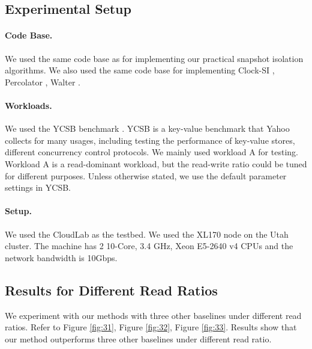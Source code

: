 


\subsection{Experimental Setup}

\paragraph{Code Base.} We used the same code base as \cite{lu2023ncc} for implementing our practical snapshot isolation algorithms. We also used the same code base for implementing Clock-SI \cite{du2013clock}, Percolator \cite{peng2010large}, Walter \cite{sovran2011transactional}.

\paragraph{Workloads.} We used the YCSB benchmark \cite{cooper2010benchmarking}. YCSB is a key-value benchmark that Yahoo collects for many usages, including testing the performance of key-value stores, different concurrency control protocols. We mainly used workload A for testing. Workload A is a read-dominant workload, but the read-write ratio could be tuned for different purposes. Unless otherwise stated, we use the default parameter settings in YCSB.

\paragraph{Setup.} We used the CloudLab \cite{duplyakin2019design} as the testbed.  We used the XL170 node on the Utah cluster. The machine has 2 10-Core, 3.4 GHz, Xeon E5-2640 v4 CPUs and the network bandwidth is 10Gbps. 




\subsection{Results for Different Read Ratios}
We experiment with our methods with three other baselines under different read ratios. Refer to Figure \ref{fig:31}, Figure \ref{fig:32}, Figure \ref{fig:33}. Results show that our method outperforms three other baselines under different read ratio.

